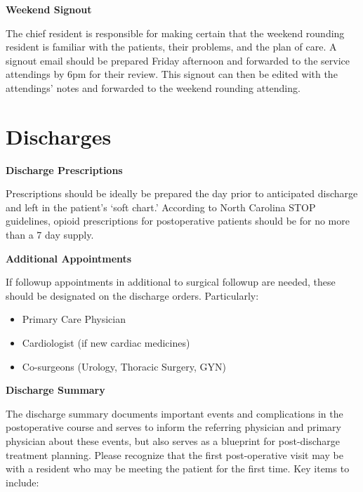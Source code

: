 \documentclass[
]{book}
\providecommand{\tightlist}{%
  \setlength{\itemsep}{0pt}\setlength{\parskip}{0pt}}
\begin{document}
\textbf{Weekend Signout}

The chief resident is responsible for making certain that the weekend rounding resident is familiar with the patients, their problems, and the plan of care. A signout email should be prepared Friday afternoon and forwarded to the service attendings by 6pm for their review. This signout can then be edited with the attendings' notes and forwarded to the weekend rounding attending.

\hypertarget{discharges}{%
\chapter{Discharges}\label{discharges}}

\textbf{Discharge Prescriptions}

Prescriptions should be ideally be prepared the day prior to anticipated discharge and left in the patient's `soft chart.' According to North Carolina STOP guidelines, opioid prescriptions for postoperative patients should be for no more than a 7 day supply.

\textbf{Additional Appointments}

If followup appointments in additional to surgical followup are needed, these should be designated on the discharge orders. Particularly:

\begin{itemize}
\tightlist
\item
  Primary Care Physician
\item
  Cardiologist (if new cardiac medicines)
\item
  Co-surgeons (Urology, Thoracic Surgery, GYN)
\end{itemize}

\textbf{Discharge Summary}

The discharge summary documents important events and complications in the postoperative course and serves to inform the referring physician and primary physician about these events, but also serves as a blueprint for post-discharge treatment planning. Please recognize that the first post-operative visit may be with a resident who may be meeting the patient for the first time. Key items to include:
\end{document}
